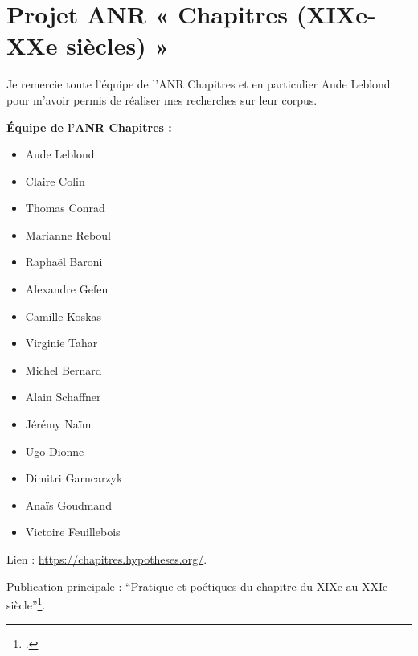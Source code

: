 \newpage 
\section{Projet ANR « Chapitres (XIXe-XXe siècles) »}\label{chapitre}

\bigskip

Je remercie toute l'équipe de l'ANR Chapitres et en particulier Aude Leblond pour m'avoir permis de réaliser mes recherches sur leur corpus. 

\bigskip

\textbf{Équipe de l'ANR Chapitres :}
\begin{itemize}
    \item Aude Leblond
    \item Claire Colin
    \item Thomas Conrad
    \item Marianne Reboul
    \item Raphaël Baroni
    \item Alexandre Gefen
    \item Camille Koskas
    \item Virginie Tahar
    \item Michel Bernard
    \item Alain Schaffner
    \item Jérémy Naïm
    \item Ugo Dionne
    \item Dimitri Garncarzyk
    \item Anaïs Goudmand
    \item Victoire Feuillebois
\end{itemize}

\bigskip

Lien : \url{https://chapitres.hypotheses.org/}.

\bigskip


Publication principale : \enquote{Pratique et poétiques du chapitre du XIXe au XXIe siècle}\footcites{colin_pratiques_2017}.